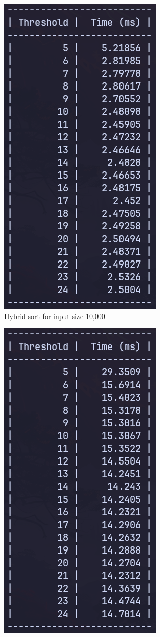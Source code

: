 \begin{figure}[H]
\begin{subfigure}[t]{0.4\textwidth}
        \centering
        \includegraphics[scale=0.4]{img/task4/hb-10000.png}
        \caption{Hybrid sort for input size 10,000}
    \end{subfigure}
    \hfill
    \begin{subfigure}[t]{0.4\textwidth}
        \centering
        \includegraphics[scale=0.4]{img/task4/hb-50k.png}

\end{subfigure}
\end{figure}
